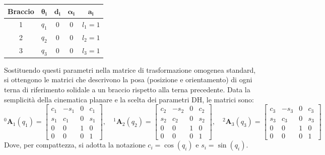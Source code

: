 ﻿\documentclass[11pt, a4paper]{article}
\begin{document}
\begin{table}[h!]
    \centering
    \begin{tabular}{|c|cccc|}
        \hline
        \textbf{Braccio} & $\boldsymbol{\theta_i}$ & $\boldsymbol{d_i}$ & $\boldsymbol{\alpha_i}$ & $\boldsymbol{a_i}$ \\
        \hline
        1 & $q_{1}$ & 0 & 0 & $l_1=1$ \\
        2 & $q_{2}$ & 0 & 0 & $l_2=1$ \\
        3 & $q_{3}$ & 0 & 0 & $l_3=1$ \\
        \hline
    \end{tabular}
\end{table}

Sostituendo questi parametri nella matrice di trasformazione omogenea standard, si ottengono le matrici che descrivono la posa (posizione e orientamento) di ogni terna di riferimento solidale a un braccio rispetto alla terna precedente.
\newpage
Data la semplicità della cinematica planare e la scelta dei parametri DH, le matrici sono:
\[
    {}^0\bm{A}_1(q_1) =
    \begin{bmatrix}
        c_1 & -s_1 & 0 & c_1 \\
        s_1 & c_1 & 0 & s_1 \\
        0 & 0 & 1 & 0 \\
        0 & 0 & 0 & 1
    \end{bmatrix} \! , \quad
    {}^1\bm{A}_2(q_2) =
    \begin{bmatrix}
        c_2 & -s_2 & 0 & c_2 \\
        s_2 & c_2 & 0 & s_2 \\
        0 & 0 & 1 & 0 \\
        0 & 0 & 0 & 1
    \end{bmatrix} \! , \quad
    {}^2\bm{A}_3(q_3) =
    \begin{bmatrix}
        c_3 & -s_3 & 0 & c_3 \\
        s_3 & c_3 & 0 & s_3 \\
        0 & 0 & 1 & 0 \\
        0 & 0 & 0 & 1
    \end{bmatrix}
\]
Dove, per compattezza, si adotta la notazione $c_i = \cos(q_i)$ e $s_i = \sin(q_i)$.
\end{document}
